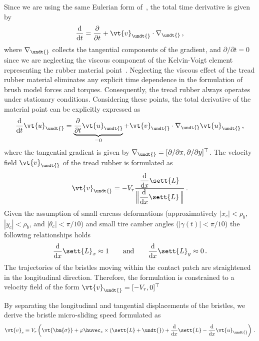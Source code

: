 Since we are using the same Eulerian form of~\cite{romano2022analytical}, the total time derivative is given by
%
\begin{equation}
  \dfrac{\mathrm{d}}{\mathrm{d}t} =  \dfrac{\partial}{\partial t} + \vt{v}_{\undt{}
} \cdot\nabla_{\undt{}
} \, \text{,}
\end{equation}
%
where $\nabla_{\undt{}
}$ collects the tangential components of the gradient, and $\partial/\partial t = 0$ since we are neglecting the viscous component of the Kelvin-Voigt element representing the rubber material point~\cite{meyers2008mechanical}. Neglecting the viscous effect of the tread rubber material eliminates any explicit time dependence in the formulation of brush model forces and torques. Consequently, the tread rubber always operates under stationary conditions. Considering these points, the total derivative of the material point can be explicitly expressed as
%
\begin{equation}
  \dfrac{\mathrm{d}}{\mathrm{d}t}\vt{u}_{\undt{}
} = \underbrace{\dfrac{\partial}{\partial t}\vt{u}_{\undt{}
}}_{=0} + \vt{v}_{\undt{}
}\cdot\nabla_{\undt{}
}\vt{u}_{\undt{}
} \, \text{,}
\end{equation}
%
where the tangential gradient is given by $\nabla_{\undt{}
} = [\partial/\partial x, \partial/\partial y]^\top$. The velocity field $\vt{v}_{\undt{}
}$ of the tread rubber is formulated as
%
\begin{equation}
  \vt{v}_{\undt{}
} = -V_r \dfrac{\dfrac{\mathrm{d}}{\mathrm{d}x} \sett{L}}{\Big\|\dfrac{\mathrm{d}}{\mathrm{d}x} \sett{L}\,\Big\|} \, \text{.}
\end{equation}
%
Given the assumption of small carcass deformations (approximatively $|x_c| < \rho_b$, $|y_c| < \rho_b$, and $|\theta_c| < \pi/10$) and small tire camber angles ($|\gamma(t)| < \pi/10$) the following relationships holds~\cite{romano2022advanced}
%
\begin{equation}
  \dfrac{\mathrm{d}}{\mathrm{d}x} \sett{L}_x \approx 1 \qquad \text{and} \qquad \dfrac{\mathrm{d}}{\mathrm{d}x} \sett{L}_y \approx 0 \, \text{.}
  \label{app3:eq:approx}
\end{equation}
%
The trajectories of the bristles moving within the contact patch are straightened in the longitudinal direction. Therefore, the formulation is constrained to a velocity field of the form $\vt{v}_{\undt{}
} = [-V_r, 0]^\top$

By separating the longitudinal and tangential displacements of the bristles, we derive the bristle micro-sliding speed formulated as
%
\begin{equation}
  \vt{v}_s = V_r\left( \vt{\bm{\sigma}} + \varphi\huvec_z \times \left(\sett{L} + \undt{}
\right) + \dfrac{\mathrm{d}}{\mathrm{d}x}\sett{L} - \dfrac{\mathrm{d}}{\mathrm{d}x}\vt{u}_{\undt{}
} \right) \, \text{.}
  \label{app3:eq:v_s_int}
\end{equation}

